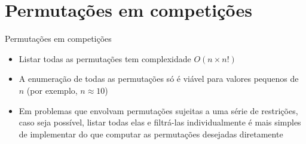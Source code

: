 \section{Permutações em competições}

\begin{frame}[fragile]{Permutações em competições}

    \begin{itemize}
        \item Listar todas as permutações tem complexidade $O(n\times n!)$

        \item A enumeração de todas as permutações só é viável para valores pequenos de $n$ (por exemplo, 
            $n \approx 10$) 

        \item Em problemas que envolvam permutações sujeitas a uma série de restrições, caso seja possível, listar 
            todas elas e filtrá-las individualmente é mais simples de implementar do que computar as permutações 
            desejadas diretamente
    \end{itemize}

\end{frame}
